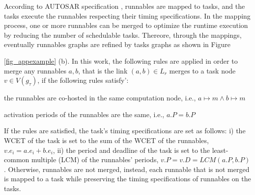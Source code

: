 According to AUTOSAR specification \cite{AUTOSAR2017SpecificationSoftware}, runnables are mapped to tasks, and the tasks execute the runnables respecting their timing specifications. In the mapping process, one or more runnables can be merged to optimize the runtime execution by reducing the number of schedulable tasks. Thereore, through the mappings, eventually runnables graphs are refined by tasks graphs as shown in Figure{\ref{fig_appexample} (b). In this work, the following rules are applied in order to merge any runnables $a,b$, that is the link $(a, b)\in L_r$ merges to a task node $v\in V(g_\tau)$, if the following rules satisfy':
\begin{enumerate*}[label=(\roman*)]
\item the runnables are co-hosted in the same computation node, i.e., $a\mapsto m \land b\mapsto m$
\item activation periods of the runnables are the same, i.e., $a.P = b.P$
\end{enumerate*}

If the rules are satisfied, the task's timing specifications are set as follows: i) the WCET of the task is set to the sum of the WCET of the runnables, $v.e_i=a.e_i + b.e_i$, ii) the period and deadline of the task is  set to the least-common multiple (LCM) of the runnables' periods, $v.P=v.D=LCM(a.P, b.P)$. Otherwise, runnables are not merged, instead, each runnable that is not merged is mapped to a task while preserving the timing specifications of runnables on the tasks.



}
